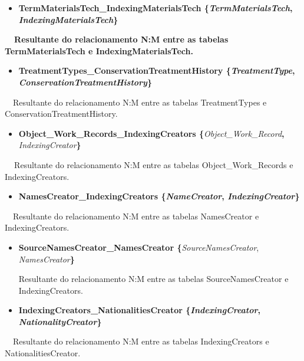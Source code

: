 \documentclass[letterpaper]{article}
\newcommand\liststyleLxv{%
\renewcommand\labelitemi{{\textbullet}}
\renewcommand\labelitemii{{\textbullet}}
\renewcommand\labelitemiii{{\textbullet}}
\renewcommand\labelitemiv{{\textbullet}}
}
\begin{document}
\bigskip

\liststyleLxv
\begin{itemize}
\item {\bfseries
TermMaterialsTech\_IndexingMaterialsTech\textmd{
\{}\textmd{\textit{TermMaterialsTech}}\textmd{,
}\textmd{\textit{IndexingMaterialsTech}}\textmd{\}}}
\end{itemize}
{\bfseries
\ \ \textmd{Resultante do relacionamento N:M entre as tabelas
TermMaterialsTech e IndexingMaterialsTech.}}


\bigskip

\liststyleLxv
\begin{itemize}
\item {\bfseries
TreatmentTypes\_ConservationTreatmentHistory\textmd{
\{}\textmd{\textit{TreatmentType}}\textmd{,
}\textmd{\textit{ConservationTreatmentHistory}}\textmd{\}}}
\end{itemize}
{
\ \ Resultante do relacionamento N:M entre as tabelas TreatmentTypes e
ConservationTreatmentHistory.}


\bigskip

\liststyleLxv
\begin{itemize}
\item {
\textbf{Object\_Work\_Records\_IndexingCreators
\{}\textit{Object\_Work\_Record}\textbf{,
}\textit{IndexingCreator}\textbf{\}}}
\end{itemize}
{
\textbf{\ \ }Resultante do relacionamento N:M entre as tabelas
Object\_Work\_Records e IndexingCreators.}


\bigskip

\liststyleLxv
\begin{itemize}
\item {\bfseries
NamesCreator\_IndexingCreators\textmd{
\{}\textmd{\textit{NameCreator}}\textmd{,
}\textmd{\textit{IndexingCreator}}\textmd{\}}}
\end{itemize}
{
\ \ Resultante do relacionamento N:M entre as tabelas NamesCreator e
IndexingCreators.}


\bigskip

\liststyleLxv
\begin{itemize}
\item {
\textbf{SourceNamesCreator\_NamesCreator \{}\textit{SourceNamesCreator},
\textit{NamesCreator}\textbf{\}}}

{
Resultante do relacionamento N:M entre as tabelas SourceNamesCreator e
IndexingCreators.}


\bigskip
\item {\bfseries
IndexingCreators\_NationalitiesCreator\textmd{
\{}\textmd{\textit{IndexingCreator}}\textmd{,
}\textmd{\textit{NationalityCreator}}\textmd{\}}}
\end{itemize}
{
\ \ Resultante do relacionamento N:M entre as tabelas IndexingCreators e
NationalitiesCreator.}
\end{document}
